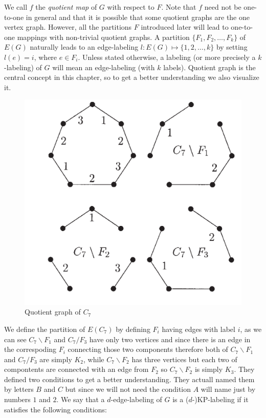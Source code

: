 \documentclass[12pt,a4paper,titlepage,openany]{report}
\begin{document}
We call $f$ the \textit{quotient map} of $G$ with respect to $F$. Note that $f$ need not be one-to-one in general and that it is possible that some quotient graphs are the one vertex graph. However, all the partitions $F$ introduced later will lead to one-to-one mappings with non-trivial quotient graphs.\newline
A partition $\{F_1,F_2,\ldots ,F_k\}$ of $E(G)$ naturally leads to an edge-labeling $l:E(G)\mapsto \{1,2,\ldots,k\}$ by setting $l(e)=i$, where $e\in F_i$. Unless stated
otherwise, a labeling (or more precisely a $k$-labeling) of $G$ will mean an edge-labeling (with $k$ labels).
\newline 
Quotient graph is the central concept in this chapter, so to get a better understanding we also visualize it.
\begin{figure}[h!]
\begin{center}
\includegraphics[width=0.5\linewidth]{figures/quotientgraph.png}
\end{center}
\caption{Quotient graph of $C_7$}
\end{figure}
We define the partition of $E(C_7)$ by defining $F_i$ having edges with label $i$, as we can see $C_7\backslash F_1$ and $C_7/F_3$ have only two vertices and since there is an edge in the correspoding $F_i$ connecting those two components therefore both of  $C_7\backslash F_1$ and $C_7/F_3$ are simply $K_2$, while $C_7\backslash F_2$ has three vertices but each two of compontents are connected with an edge from $F_2$ so $C_7\backslash F_2$ is simply $K_3$.   
\newline
They defined two conditions to get a better understanding. They actuall named them by letters $B$ and $C$ but since we will not need the condition $A$ will name just by numbers $1$ and $2$.\newline
We say that a $d$-edge-labeling of $G$ is a ($d$-)KP-labeling if it satisfies the following conditions:
\newline
\end{document}
